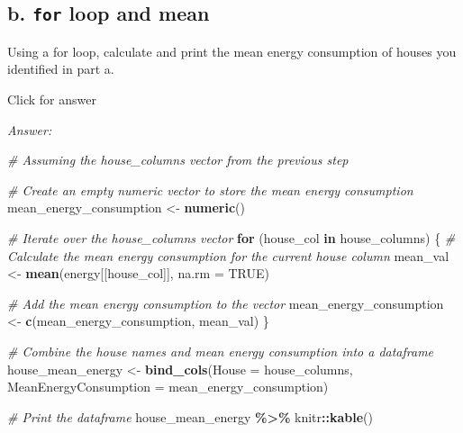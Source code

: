 \documentclass[
]{book}
\newenvironment{Shaded}{\begin{snugshade}}{\end{snugshade}}
\newcommand{\AttributeTok}[1]{\textcolor[rgb]{0.13,0.29,0.53}{#1}}
\newcommand{\CommentTok}[1]{\textcolor[rgb]{0.56,0.35,0.01}{\textit{#1}}}
\newcommand{\ConstantTok}[1]{\textcolor[rgb]{0.56,0.35,0.01}{#1}}
\newcommand{\ControlFlowTok}[1]{\textcolor[rgb]{0.13,0.29,0.53}{\textbf{#1}}}
\newcommand{\FunctionTok}[1]{\textcolor[rgb]{0.13,0.29,0.53}{\textbf{#1}}}
\newcommand{\NormalTok}[1]{#1}
\newcommand{\OtherTok}[1]{\textcolor[rgb]{0.56,0.35,0.01}{#1}}
\newcommand{\SpecialCharTok}[1]{\textcolor[rgb]{0.81,0.36,0.00}{\textbf{#1}}}
\begin{document}
\hypertarget{b.-for-loop-and-mean}{%
\subsection{\texorpdfstring{b. \texttt{for} loop and mean}{b. for loop and mean}}\label{b.-for-loop-and-mean}}

Using a for loop, calculate and print the mean energy consumption of houses you identified in part a.

Click for answer

\emph{Answer:}

\begin{Shaded}
\begin{Highlighting}[]
\CommentTok{\# Assuming the house\_columns vector from the previous step}

\CommentTok{\# Create an empty numeric vector to store the mean energy consumption}
\NormalTok{mean\_energy\_consumption }\OtherTok{\textless{}{-}} \FunctionTok{numeric}\NormalTok{()}

\CommentTok{\# Iterate over the house\_columns vector}
\ControlFlowTok{for}\NormalTok{ (house\_col }\ControlFlowTok{in}\NormalTok{ house\_columns) \{}
  \CommentTok{\# Calculate the mean energy consumption for the current house column}
\NormalTok{  mean\_val }\OtherTok{\textless{}{-}} \FunctionTok{mean}\NormalTok{(energy[[house\_col]], }\AttributeTok{na.rm =} \ConstantTok{TRUE}\NormalTok{)}
  
  \CommentTok{\# Add the mean energy consumption to the vector}
\NormalTok{  mean\_energy\_consumption }\OtherTok{\textless{}{-}} \FunctionTok{c}\NormalTok{(mean\_energy\_consumption, mean\_val)}
\NormalTok{\}}

\CommentTok{\# Combine the house names and mean energy consumption into a dataframe}
\NormalTok{house\_mean\_energy }\OtherTok{\textless{}{-}} \FunctionTok{bind\_cols}\NormalTok{(}\AttributeTok{House =}\NormalTok{ house\_columns, }\AttributeTok{MeanEnergyConsumption =}\NormalTok{ mean\_energy\_consumption)}

\CommentTok{\# Print the dataframe}
\NormalTok{house\_mean\_energy }\SpecialCharTok{\%\textgreater{}\%}\NormalTok{  knitr}\SpecialCharTok{::}\FunctionTok{kable}\NormalTok{()}
\end{Highlighting}
\end{Shaded}
\end{document}

